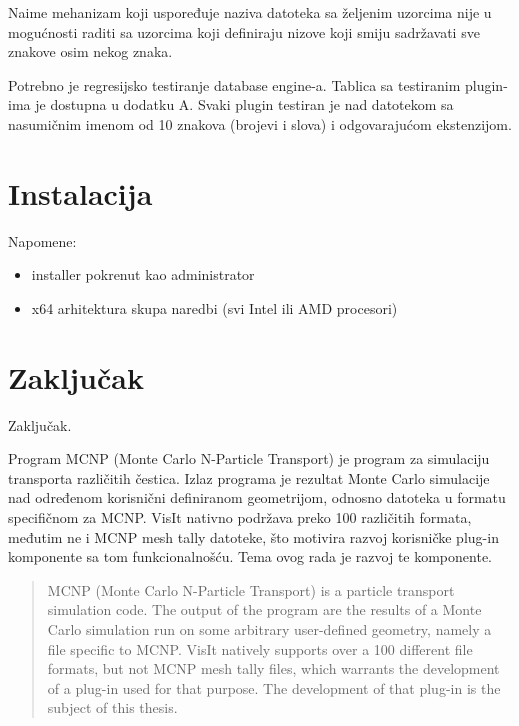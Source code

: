 \documentclass[times, utf8, zavrsni]{fer}
\begin{document}
Naime mehanizam koji uspoređuje naziva datoteka sa željenim uzorcima nije u mogućnosti raditi sa uzorcima koji definiraju nizove koji smiju sadržavati sve znakove osim nekog znaka.

Potrebno je regresijsko testiranje database engine-a.
Tablica sa testiranim plugin-ima je dostupna u dodatku A.
Svaki plugin testiran je nad datotekom sa nasumičnim imenom od 10 znakova (brojevi i slova) i odgovarajućom ekstenzijom.


\chapter{Instalacija}
Napomene:
\begin{itemize}
	\item installer pokrenut kao administrator
	\item x64 arhitektura skupa naredbi (svi Intel ili AMD procesori)
\end{itemize}



\chapter{Zaključak}
Zaključak.




\begin{sazetak}
Program MCNP (Monte Carlo N-Particle Transport) je program za simulaciju transporta različitih čestica.
Izlaz programa je rezultat Monte Carlo simulacije nad određenom korisnični definiranom geometrijom, odnosno datoteka u formatu specifičnom za MCNP.
VisIt nativno podržava preko 100 različitih formata, međutim ne i MCNP mesh tally datoteke, što motivira razvoj korisničke plug-in komponente sa tom funkcionalnošću.
Tema ovog rada je razvoj te komponente.

\end{sazetak}

\begin{abstract}
MCNP (Monte Carlo N-Particle Transport) is a particle transport simulation code.
The output of the program are the results of a Monte Carlo simulation run on some arbitrary user-defined geometry, namely a file specific to MCNP.
VisIt natively supports over a 100 different file formats, but not MCNP mesh tally files, which warrants the development of a plug-in used for that purpose.
The development of that plug-in is the subject of this thesis. 

\end{abstract}
\end{document}
